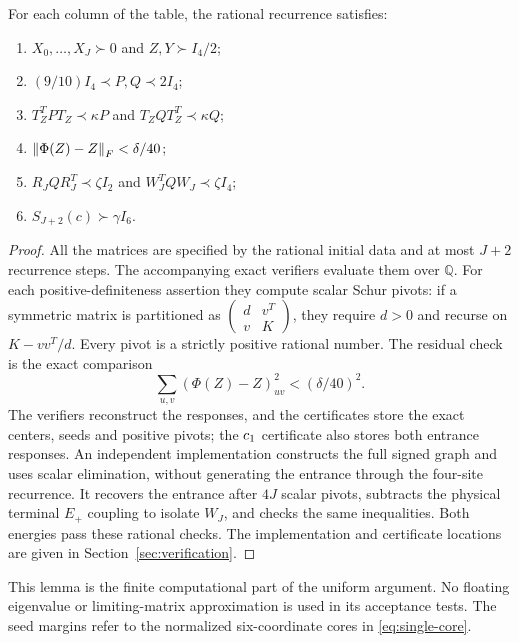 \begin{lemma}\label{lem:finite-premises}
For each column of the table, the rational recurrence satisfies:
\begin{enumerate}
\item $X_0,\ldots,X_J\succ0$ and $Z,Y\succ I_4/2$;
\item $(9/10)I_4\prec P,Q\prec2I_4$;
\item $T_Z^TPT_Z\prec\kappa P$ and $T_ZQT_Z^T\prec\kappa Q$;
\item $\left\lVert\Phi(Z)-Z\right\rVert_F<\delta/40$;
\item $R_JQR_J^T\prec\zeta I_2$ and $W_J^TQW_J\prec\zeta I_4$;
\item $S_{J+2}(c)\succ\gamma I_6$.
\end{enumerate}
\end{lemma}
\begin{proof}
All the matrices are specified by the rational initial data and at most
$J+2$ recurrence steps. The accompanying exact verifiers evaluate them over
$\mathbb Q$. For each positive-definiteness assertion they compute scalar
Schur pivots: if a symmetric matrix is partitioned as
$\left(\begin{smallmatrix}d&v^T\\v&K\end{smallmatrix}\right)$, they require
$d>0$ and recurse on $K-vv^T/d$. Every pivot is a strictly positive
rational number. The residual check is the exact comparison
\[
 \sum_{u,v}(\Phi(Z)-Z)_{uv}^2<(\delta/40)^2.
\]
The verifiers reconstruct the responses, and the certificates store the
exact centers, seeds and positive pivots; the $c_1$ certificate also
stores both entrance responses. An independent implementation constructs the full signed graph and
uses scalar elimination, without generating the entrance through the
four-site recurrence. It recovers the entrance after $4J$ scalar pivots,
subtracts the physical terminal $E_+$ coupling to isolate $W_J$, and
checks the same inequalities. Both energies pass these rational checks.
The implementation and certificate locations are given in
Section~\ref{sec:verification}.
\end{proof}

This lemma is the finite computational part of the uniform argument. No
floating eigenvalue or limiting-matrix approximation is used in its
acceptance tests. The seed margins refer to the normalized six-coordinate
cores in \eqref{eq:single-core}.
